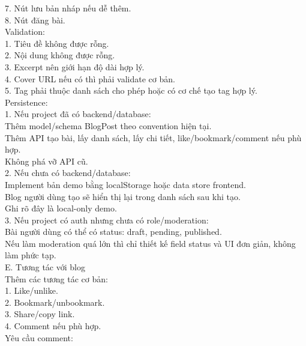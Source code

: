 \begin{enumerate}
7. Nút lưu bản nháp nếu dễ thêm. \\
8. Nút đăng bài. \\

Validation: \\

1. Tiêu đề không được rỗng. \\
2. Nội dung không được rỗng. \\
3. Excerpt nên giới hạn độ dài hợp lý. \\
4. Cover URL nếu có thì phải validate cơ bản. \\
5. Tag phải thuộc danh sách cho phép hoặc có cơ chế tạo tag hợp lý. \\

Persistence: \\

1. Nếu project đã có backend/database: \\
\* Thêm model/schema BlogPost theo convention hiện tại. \\
\* Thêm API tạo bài, lấy danh sách, lấy chi tiết, like/bookmark/comment nếu phù hợp. \\
\* Không phá vỡ API cũ. \\

2. Nếu chưa có backend/database: \\
\* Implement bản demo bằng localStorage hoặc data store frontend. \\
\* Blog người dùng tạo sẽ hiển thị lại trong danh sách sau khi tạo. \\
\* Ghi rõ đây là local-only demo. \\

3. Nếu project có auth nhưng chưa có role/moderation: \\
\* Bài người dùng có thể có status: draft, pending, published. \\
\* Nếu làm moderation quá lớn thì chỉ thiết kế field status và UI đơn giản, không làm phức tạp. \\


E. Tương tác với blog \\
Thêm các tương tác cơ bản: \\

1. Like/unlike. \\
2. Bookmark/unbookmark. \\
3. Share/copy link. \\
4. Comment nếu phù hợp. \\

Yêu cầu comment: \\


\end{enumerate}
